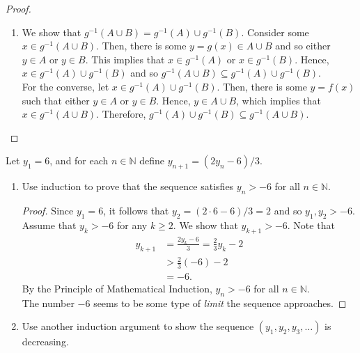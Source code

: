 \documentclass[12pt]{article}
\newcommand{\N}{\mathbb{N}}
\newenvironment{problem}[2][Problem]{\begin{trivlist}
		\item[\hskip \labelsep {\bfseries #1}\hskip \labelsep {\bfseries #2.}]}{\end{trivlist}}
\begin{document}
\begin{problem}{1.2.9}
\begin{enumerate}[label=(\alph*)]
\begin{proof}
\begin{enumerate}[label=(\alph*)]
					\item We show that $g^{-1}(A\cup B) = g^{-1}(A)\cup g^{-1}(B)$. Consider some $x\in g^{-1}(A\cup B)$. Then, there is some $y=g(x) \in A\cup B$ and so either $y\in A$ or $y\in B$. This implies that $x\in g^{-1}(A)$ or $x\in g^{-1}(B)$. Hence, $x\in g^{-1}(A)\cup g^{-1}(B)$ and so $g^{-1}(A\cup B) \subseteq g^{-1}(A)\cup g^{-1}(B)$.\\
					
					For the converse, let $x\in g^{-1}(A)\cup g^{-1}(B)$. Then, there is some $y=f(x)$ such that either $y\in A$ or $y\in B$. Hence, $y\in A\cup B$, which implies that $x\in g^{-1}(A\cup B)$. Therefore, $g^{-1}(A)\cup g^{-1}(B) \subseteq g^{-1}(A\cup B)$.
				\end{enumerate}
			\end{proof}
		\end{enumerate}
	\end{problem}

	\begin{problem}{1.2.12}
		Let $y_{1} = 6$, and for each $n\in \N$ define $y_{n+1} = (2y_{n}-6)/3$.
		\begin{enumerate}[label=(\alph*)]
			\item Use induction to prove that the sequence satisfies $y_{n} > -6$ for all $n\in \N$.
			\begin{proof}
				Since $y_{1} = 6$, it follows that $y_{2} = (2\cdot 6-6)/3 = 2$ and so $y_{1},y_{2}>-6$. Assume that $y_{k} > -6$ for any $k\geq 2$. We show that $y_{k+1} > -6$. Note that
				\begin{align*}
					y_{k+1} &= \frac{2y_{k}-6}{3} = \frac{2}{3} y_{k}-2\\
					&> \frac{2}{3}(-6) -2 \\
					&= -6. 
				\end{align*}
			By the Principle of Mathematical Induction, $y_{n} > -6$ for all $n\in \N$.\\
			
			The number $-6$ seems to be some type of \textit{limit} the sequence approaches.
			\end{proof}
			
			\item Use another induction argument to show the sequence $(y_{1},y_{2},y_{3},\ldots)$ is decreasing.
		\end{enumerate}
	\end{problem}
	
\end{document}
